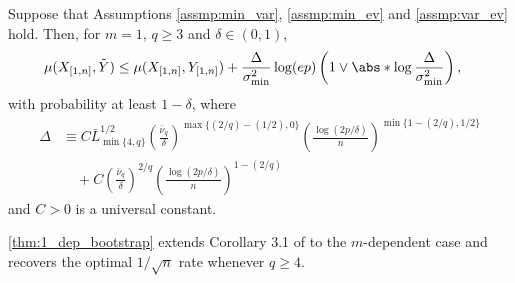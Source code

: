 \documentclass[aos]{imsart}
\begin{document}
\begin{theorem} \label{thm:1_dep_bootstrap}
    Suppose that Assumptions \eqref{assmp:min_var}, \eqref{assmp:min_ev} and \eqref{assmp:var_ev} hold. Then, for $m=1$, $q \geq 3$ and $\delta \in (0, 1)$, 
    \begin{equation} \label{eq:bootstrap_error_bound}
    \begin{aligned}
        \mu(X_{[1,n]}, \tilde{Y}) 
        & \leq \mu(X_{[1,n]}, Y_{[1,n]})
        + \frac{\Delta}{\sigma_{\min}^2} \log(ep) \left( 1 \vee \abs*{\log\frac{\Delta}{\sigma_{\min}^2}} \right),
    \end{aligned}
    \end{equation}
    with probability at least $1 - \delta$, where
    \begin{equation*}
    \begin{aligned}
        \Delta & \equiv C \bar{L}_{\min\{4, q\}}^{1/2} \left(\frac{\bar{\nu}_{q}}{\delta} \right)^{\max\{(2/q)-(1/2),0\}}
        \left(\frac{\log(2p/\delta)}{n}\right)^{\min\{1-(2/q), 1/2\}} \\
        & \quad + C \left(\frac{\bar{\nu}_{q}}{\delta} \right)^{2/q} \left(\frac{\log(2p/\delta)}{n}\right)^{1-(2/q)}
    \end{aligned}
    \end{equation*}
    and $C > 0$ is a universal constant.
\end{theorem}
\cref{thm:1_dep_bootstrap} extends Corollary 3.1 of  to the $m$-dependent case and recovers the optimal $1/\sqrt{n}$ rate whenever $q \geq 4$.
\end{document}
